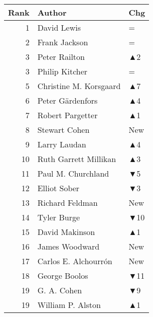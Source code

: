 \documentclass[
  10pt,
  letterpaper,
  DIV=11,
  numbers=noendperiod,
  twoside]{scrartcl}
\begin{document}
\begin{table}
\begin{minipage}{0.20\linewidth}
{\begin{tabular}{rll}
\toprule
Rank & Author & Chg\\
\midrule
1 & David Lewis & =\\
2 & Frank Jackson & =\\
3 & Peter Railton & \textcolor[RGB]{34,178,34}{▲2}\\
3 & Philip Kitcher & =\\
5 & Christine M. Korsgaard & \textcolor[RGB]{34,178,34}{▲7}\\
6 & Peter Gärdenfors & \textcolor[RGB]{34,178,34}{▲4}\\
7 & Robert Pargetter & \textcolor[RGB]{34,178,34}{▲1}\\
8 & Stewart Cohen & \textcolor[RGB]{34,178,34}{New}\\
9 & Larry Laudan & \textcolor[RGB]{34,178,34}{▲4}\\
10 & Ruth Garrett Millikan & \textcolor[RGB]{34,178,34}{▲3}\\
11 & Paul M. Churchland & \textcolor[RGB]{178,34,34}{▼5}\\
12 & Elliot Sober & \textcolor[RGB]{178,34,34}{▼3}\\
13 & Richard Feldman & \textcolor[RGB]{34,178,34}{New}\\
14 & Tyler Burge & \textcolor[RGB]{178,34,34}{▼10}\\
15 & David Makinson & \textcolor[RGB]{34,178,34}{▲1}\\
16 & James Woodward & \textcolor[RGB]{34,178,34}{New}\\
17 & Carlos E. Alchourrón & \textcolor[RGB]{34,178,34}{New}\\
18 & George Boolos & \textcolor[RGB]{178,34,34}{▼11}\\
19 & G. A. Cohen & \textcolor[RGB]{178,34,34}{▼9}\\
19 & William P. Alston & \textcolor[RGB]{34,178,34}{▲1}\\
\bottomrule
\end{tabular}

}

\end{minipage}%
%
\begin{minipage}{0.20\linewidth}


\centering{

}
\end{minipage}
\end{table}
\end{document}
